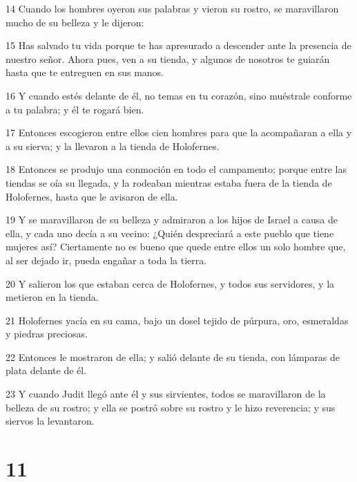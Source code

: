\par 14 Cuando los hombres oyeron sus palabras y vieron su rostro, se maravillaron mucho de su belleza y le dijeron:
\par 15 Has salvado tu vida porque te has apresurado a descender ante la presencia de nuestro señor. Ahora pues, ven a su tienda, y algunos de nosotros te guiarán hasta que te entreguen en sus manos.
\par 16 Y cuando estés delante de él, no temas en tu corazón, sino muéstrale conforme a tu palabra; y él te rogará bien.
\par 17 Entonces escogieron entre ellos cien hombres para que la acompañaran a ella y a su sierva; y la llevaron a la tienda de Holofernes.
\par 18 Entonces se produjo una conmoción en todo el campamento; porque entre las tiendas se oía su llegada, y la rodeaban mientras estaba fuera de la tienda de Holofernes, hasta que le avisaron de ella.
\par 19 Y se maravillaron de su belleza y admiraron a los hijos de Israel a causa de ella, y cada uno decía a su vecino: ¿Quién despreciará a este pueblo que tiene mujeres así? Ciertamente no es bueno que quede entre ellos un solo hombre que, al ser dejado ir, pueda engañar a toda la tierra.
\par 20 Y salieron los que estaban cerca de Holofernes, y todos sus servidores, y la metieron en la tienda.
\par 21 Holofernes yacía en su cama, bajo un dosel tejido de púrpura, oro, esmeraldas y piedras preciosas.
\par 22 Entonces le mostraron de ella; y salió delante de su tienda, con lámparas de plata delante de él.
\par 23 Y cuando Judit llegó ante él y sus sirvientes, todos se maravillaron de la belleza de su rostro; y ella se postró sobre su rostro y le hizo reverencia; y sus siervos la levantaron.

\chapter{11}

